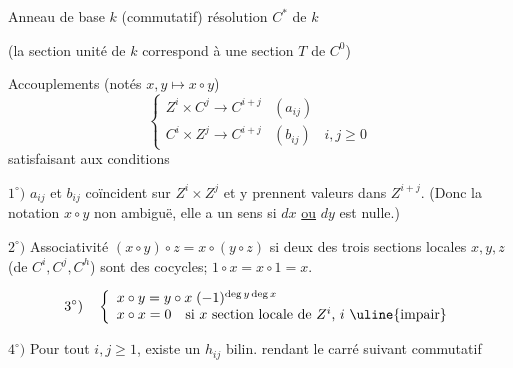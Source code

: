 Anneau de base $k$ (commutatif)
résolution $C^*$ de $k$



(la section unité de $k$ correspond à une section $T$ de $C^0$)


Accouplements (notés $x,y\longmapsto x\circ y$)
\[
\left\{\begin{array}{lll}
Z^i\times C^j\longrightarrow C^{i+j}&(a_{ij})\\
C^i\times Z^j\longrightarrow C^{i+j}&(b_{ij})&i,j\geq0
\end{array}\right.
\]
satisfaisant aux conditions

$1^\circ)$ $a_{ij}$ et $b_{ij}$ coïncident sur $Z^i\times Z^j$ et
y prennent valeurs dans $Z^{i+j}$. (Donc la notation
$x\circ y$ non ambiguë, elle a un sens si $dx$ \uline{ou} $dy$ est nulle.)

$2^\circ)$ Associativité $(x\circ y)\circ z=x\circ(y\circ z)$ si deux
des trois sections locales $x,y,z$ (de $C^i,C^j,C^h$)
sont des cocycles; $1\circ x=x\circ1=x$.

\[
3^\circ)\quad\left\{\begin{array}{l}
x\circ y=y\circ x\;(-1)^{\deg y\deg x}\\
x\circ x=0\quad\text{si $x$ section locale de $Z^i$, $i$ \uline{impair}}
\end{array}\right.
\]


$4^\circ)$ Pour tout $i,j\geq1$, existe un $h_{ij}$ bilin.
rendant le carré suivant commutatif

